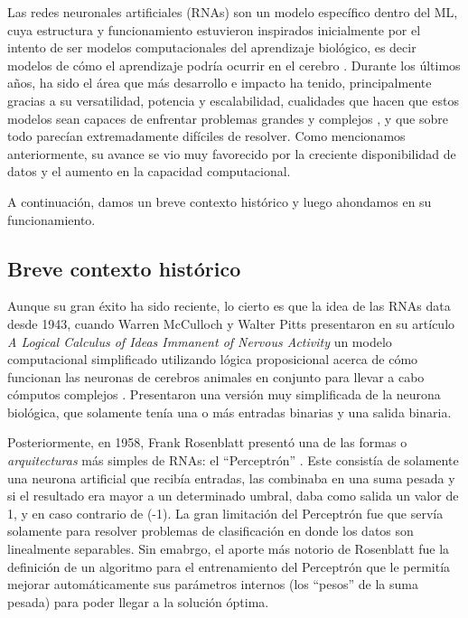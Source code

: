 \documentclass[../../main.tex]{subfiles}
\begin{document}
Las redes neuronales artificiales (RNAs) son un modelo específico dentro del ML, cuya
estructura y funcionamiento estuvieron inspirados inicialmente por el intento de ser
modelos computacionales del aprendizaje biológico, es decir modelos de cómo el aprendizaje
podría ocurrir en el cerebro \cite{deep-learning}. Durante los últimos años, ha sido el
área que más desarrollo e impacto ha tenido, principalmente gracias a su versatilidad,
potencia y escalabilidad, cualidades que hacen que estos modelos sean capaces de enfrentar
problemas grandes y complejos \cite{hands-on-ML-sklearn-tf}, y que sobre todo parecían
extremadamente difíciles de resolver. Como mencionamos anteriormente, su avance se vio muy
favorecido por la creciente disponibilidad de datos y el aumento en la capacidad
computacional.

A continuación, damos un breve contexto histórico y luego ahondamos en su funcionamiento.

\subsection{Breve contexto histórico}
Aunque su gran éxito ha sido reciente, lo cierto es que la idea de las RNAs data desde
1943, cuando Warren McCulloch y Walter Pitts presentaron en su artículo \textit{A Logical
Calculus of Ideas Immanent of Nervous Activity} \cite{mculloch-pitts-1943} un modelo
computacional simplificado utilizando lógica proposicional acerca de cómo funcionan las
neuronas de cerebros animales en conjunto para llevar a cabo cómputos complejos
\cite{hands-on-ML-sklearn-tf}. Presentaron una versión muy simplificada de la neurona
biológica, que solamente tenía una o más entradas binarias y una salida binaria.

Posteriormente, en 1958, Frank Rosenblatt presentó una de las formas o
\textit{arquitecturas} más simples de RNAs: el ``Perceptrón''
\cite{rosenblatt1958perceptron}. Este consistía de solamente una neurona artificial que
recibía entradas, las combinaba en una suma pesada y si el resultado era mayor a un
determinado umbral, daba como salida un valor de 1, y en caso contrario de (-1). La gran
limitación del Perceptrón fue que servía solamente para resolver problemas de
clasificación en donde los datos son linealmente separables. Sin emabrgo, el aporte más
notorio de Rosenblatt fue la definición de un algoritmo para el entrenamiento del
Perceptrón que le permitía mejorar automáticamente sus parámetros internos (los ``pesos''
de la suma pesada) para poder llegar a la solución óptima.
\end{document}
